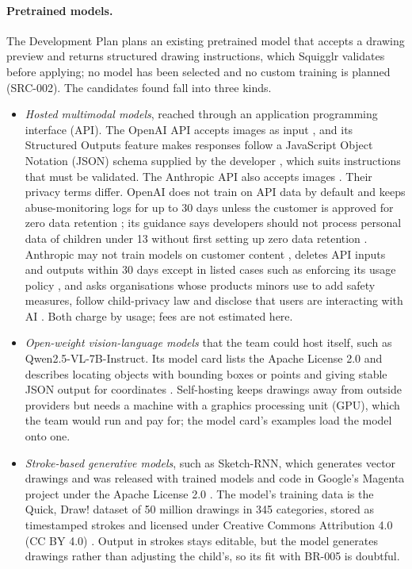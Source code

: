 \documentclass[12pt]{article}
\renewcommand{\_}{\textunderscore\allowbreak}%
\begin{document}
\paragraph{Pretrained models.}
The Development Plan plans an existing pretrained model that accepts a drawing
preview and returns structured drawing instructions, which Squigglr validates
before applying; no model has been selected and no custom training is planned
(SRC-002). The candidates found fall into three kinds.
\begin{itemize}
  \item \emph{Hosted multimodal models}, reached through an application
  programming interface (API). The OpenAI API accepts images as input
  \citep{OpenAI2026DataControls}, and its Structured Outputs feature makes
  responses follow a JavaScript Object Notation (JSON) schema supplied by the
  developer \citep{OpenAI2026StructuredOutputs}, which suits instructions that
  must be validated. The Anthropic API also accepts images
  \citep{Anthropic2026Vision}. Their privacy terms differ. OpenAI does not train
  on API data by default and keeps abuse-monitoring logs for up to 30 days
  unless the customer is approved for zero data retention
  \citep{OpenAI2026DataControls}; its guidance says developers should not
  process personal data of children under 13 without first setting up zero data
  retention \citep{OpenAI2026Under18}. Anthropic may not train models on
  customer content \citep{Anthropic2025CommercialTerms}, deletes API inputs and
  outputs within 30 days except in listed cases such as enforcing its usage
  policy \citep{Anthropic2026Retention}, and asks organisations whose products
  minors use to add safety measures, follow child-privacy law and disclose that
  users are interacting with AI \citep{Anthropic2026Minors}. Both charge by
  usage; fees are not estimated here.
  \item \emph{Open-weight vision-language models} that the team could host
  itself, such as Qwen2.5-VL-7B-Instruct. Its model card lists the Apache
  License 2.0 and describes locating objects with bounding boxes or points and
  giving stable JSON output for coordinates \citep{Qwen2026VL7B}. Self-hosting
  keeps drawings away from outside providers but needs a machine with a graphics
  processing unit (GPU), which the team would run and pay for; the model card's
  examples load the model onto one.
  \item \emph{Stroke-based generative models}, such as Sketch-RNN, which
  generates vector drawings and was released with trained models and code in
  Google's Magenta project \citep{Eck2017SketchRNN} under the Apache License 2.0
  \citep{Magenta2016License}. The model's training data is the Quick, Draw!
  dataset of 50 million drawings in 345 categories, stored as timestamped
  strokes and licensed under Creative Commons Attribution 4.0 (CC BY 4.0)
  \citep{Google2017QuickDraw}. Output in strokes stays editable, but the model
  generates drawings rather than adjusting the child's, so its fit with BR-005
  is doubtful.
\end{itemize}
\end{document}
